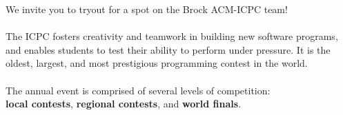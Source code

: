\documentclass{article}
\begin{document}


We invite you to tryout for a spot on the Brock ACM-ICPC team!\\
\\
The ICPC fosters creativity and teamwork in building new software programs,
and enables students to test their ability to perform under pressure.
It is the oldest, largest, and most prestigious programming contest in the world.\\
\\
The annual event is comprised of several levels of competition:\\
\textbf{local contests}, \textbf{regional contests}, and \textbf{world finals}.\\
\\
\end{document}
